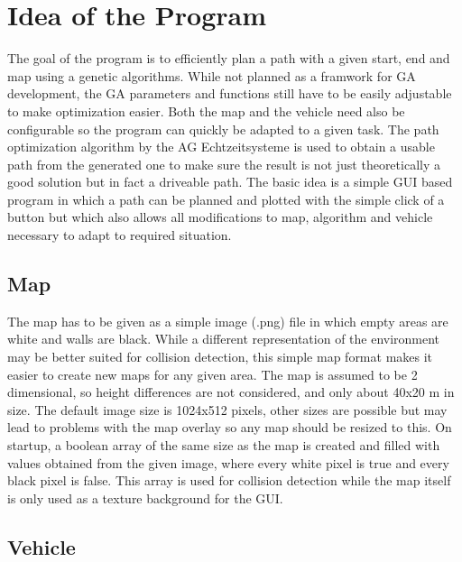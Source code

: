 \chapter{Idea of the Program}
\label{cha:program_idea}

The goal of the program is to efficiently plan a path with a given start, end and map using a genetic algorithms. While not planned as a framwork for GA development, the GA parameters and functions still have to be easily adjustable to make optimization easier. Both the map and the vehicle need also be configurable so the program can quickly be adapted to a given task. The path optimization algorithm by the AG Echtzeitsysteme is used to obtain a usable path from the generated one to make sure the result is not just theoretically a good solution but in fact a driveable path.
The basic idea is a simple GUI based program in which a path can be planned and plotted with the simple click of a button but which also allows all modifications to map, algorithm and vehicle necessary to adapt to required situation.

\section{Map}
\label{sec:map}

The map has to be given as a simple image (.png) file in which empty areas are white and walls are black. While a different representation of the environment may be better suited for collision detection, this simple map format makes it easier to create new maps for any given area. The map is assumed to be 2 dimensional, so height differences are not considered, and only about 40x20 m in size. The default image size is 1024x512 pixels, other sizes are possible but may lead to problems with the map overlay so any map should be resized to this. On startup, a boolean array of the same size as the map is created and filled with values obtained from the given image, where every white pixel is true and every black pixel is false. This array is used for collision detection while the map itself is only used as a texture background for the GUI.

\section{Vehicle}
\label{sec:vehicle}

